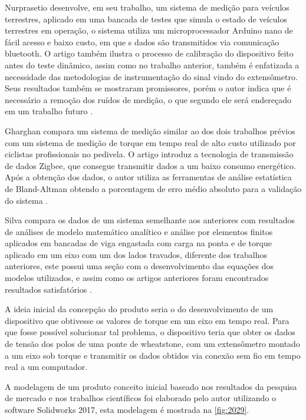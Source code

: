 Nurprasetio desenvolve, em seu trabalho, um sistema de medição para veículos terrestres, aplicado em uma bancada de testes que simula o estado de veículos terrestres em operação, o sistema
utiliza um microprocessador Arduino nano de fácil acesso e baixo custo, em que s dados são transmitidos via comunicação bluetooth.
O artigo também ilustra o processo de calibração do dispositivo feito antes do teste dinâmico, assim como no trabalho anterior, também é enfatizada a necessidade das metodologias de instrumentação
do sinal vindo do extensômetro.
Seus resultados também se mostraram promissores, porém o autor indica que é necessário a remoção dos ruídos de medição, o que segundo ele será endereçado em um trabalho futuro \autocite{Nurprasetio2018}.

Gharghan compara um sistema de medição similar ao dos dois trabalhos prévios com um sistema de medição de torque em tempo real de alto custo utilizado por ciclistas profissionais no pedivela.
O artigo introduz a tecnologia de transmissão de dados Zigbee, que consegue transmitir dados a um baixo consumo energético.
Após a obtenção dos dados, o autor utiliza as ferramentas de análise estatística de Bland-Altman obtendo a porcentagem de erro médio absoluto para a validação do sistema \autocite{Gharghan2017}.

Silva compara os dados de um sistema semelhante aos anteriores com resultados de análises de modelo matemático analítico e análise por elementos finitos aplicados em bancadas de viga engastada com carga
na ponta e de torque aplicado em um eixo com um dos lados travados, diferente dos trabalhos anteriores, este possui uma seção com o desenvolvimento das equações dos modelos utilizados, e assim como os artigos
anteriores foram encontrados resultados satisfatórios \autocite{Silva2017}.

A ideia inicial da concepção do produto seria o do desenvolvimento de um dispositivo que obtivesse os valores de torque em um eixo em tempo real.
Para que fosse possível solucionar tal problema, o dispositivo teria que obter os dados de tensão dos polos de uma ponte de wheatstone, com um extensômetro montado a um eixo sob torque e transmitir os dados obtidos
via conexão sem fio em tempo real a um computador.

A modelagem de um produto conceito inicial baseado nos resultados da pesquisa de mercado e nos trabalhos científicos foi elaborado pelo autor utilizando o software Solidworks 2017,
esta modelagem é mostrada na \autoref{fig:2029}.

